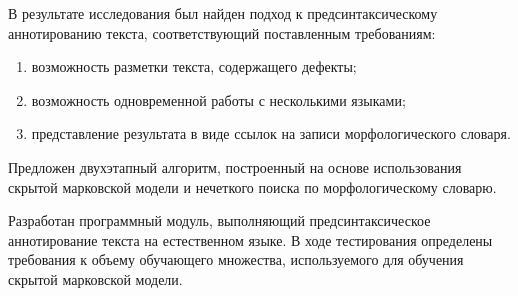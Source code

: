 В результате исследования был найден подход к предсинтаксическому аннотированию текста, соответствующий поставленным требованиям:
\begin{enumerate}
	\item 
	возможность разметки текста, содержащего дефекты;
	\item
	возможность одновременной работы с несколькими языками;
	\item
	представление результата в виде ссылок на записи морфологического словаря.
\end{enumerate}

Предложен двухэтапный алгоритм, построенный на основе использования скрытой марковской модели и нечеткого поиска по морфологическому словарю.

Разработан программный модуль, выполняющий предсинтаксическое аннотирование текста на естественном языке. В ходе тестирования определены требования к объему обучающего множества, используемого для обучения скрытой марковской модели.